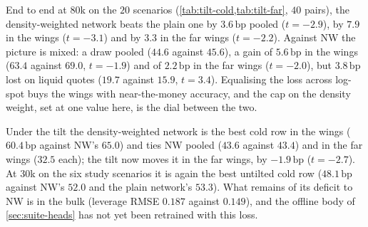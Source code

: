 \documentclass[11pt,a4paper]{article}
\newcommand{\bp}{\,\mathrm{bp}}
\begin{document}
End to end at $80$k on the $20$ scenarios (\cref{tab:tilt-cold,tab:tilt-far}, $40$ pairs), the density-weighted network beats the plain one by $3.6\bp$ pooled ($t=-2.9$), by $7.9$ in the wings ($t=-3.1$) and by $3.3$ in the far wings ($t=-2.2$). Against NW the picture is mixed: a draw pooled ($44.6$ against $45.6$), a gain of $5.6\bp$ in the wings ($63.4$ against $69.0$, $t=-1.9$) and of $2.2\bp$ in the far wings ($t=-2.0$), but $3.8\bp$ lost on liquid quotes ($19.7$ against $15.9$, $t=3.4$). Equalising the loss across log-spot buys the wings with near-the-money accuracy, and the cap on the density weight, set at one value here, is the dial between the two.

Under the tilt the density-weighted network is the best cold row in the wings ($60.4\bp$ against NW's $65.0$) and ties NW pooled ($43.6$ against $43.4$) and in the far wings ($32.5$ each); the tilt now moves it in the far wings, by $-1.9\bp$ ($t=-2.7$). At $30$k on the six study scenarios it is again the best untilted cold row ($48.1\bp$ against NW's $52.0$ and the plain network's $53.3$). What remains of its deficit to NW is in the bulk (leverage RMSE $0.187$ against $0.149$), and the offline body of \cref{sec:suite-heads} has not yet been retrained with this loss.
\end{document}
